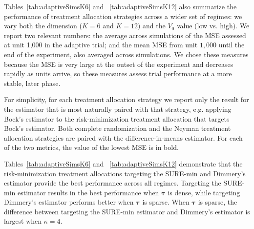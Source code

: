 \documentclass{article}
\newcommand{\bstau}{\boldsymbol \tau}
\newcommand{\hbstau}{\boldsymbol{\hat \tau}}
\newcommand{\bsdeltad}{\boldsymbol{\hat \delta_{\textbf{D}}}}
\newcommand{\bsdeltb}{\boldsymbol {\hat \delta_B}}
\newcommand{\bsdelts}{\boldsymbol {\hat \delta_S}}
\begin{document}



Tables~\ref{tab:adaptiveSimsK6} and ~\ref{tab:adaptiveSimsK12} also summarize the performance of treatment allocation strategies across a wider set of regimes: we vary both the dimension ($K = 6$ and $K = 12)$ and the $V_0$ value (low vs. high). We report two relevant numbers: the average across simulations of the MSE assessed at unit 1,000 in the adaptive trial; and the mean MSE from unit $1,000$ until the end of the experiment, also averaged across simulations. We chose these  measures because the MSE is very large at the outset of the experiment and decreases rapidly as units arrive, so these measures assess trial performance at a more stable, later phase. 

For simplicity, for each treatment allocation strategy we report only the result for the estimator that is most naturally paired with that strategy, e.g. applying Bock's estimator to the risk-minimization treatment allocation that targets Bock's estimator. Both complete randomization and the Neyman treatment allocation strategies are paired with the difference-in-means estimator. For each of the two metrics, the value of the lowest MSE is in bold.


Tables~\ref{tab:adaptiveSimsK6} and ~\ref{tab:adaptiveSimsK12} demonstrate that the risk-minimization treatment allocations targeting the SURE-min and Dimmery's estimator provide the best performance across all regimes. 
Targeting the SURE-min estimator results in the best performance when $\bstau$ is dense, while targeting Dimmery's estimator performs better when $\bstau$ is sparse. When $\bstau$ is sparse, the difference between targeting the SURE-min estimator and Dimmery's estimator is largest when $\kappa = 4$.
\end{document}
